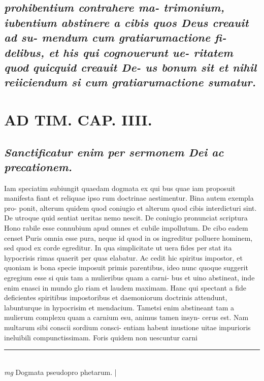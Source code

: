 \documentclass{article}
\begin{document}
\begin{pages}
\subsection*{\textit{prohibentium contrahere ma- trimonium, iubentium abstinere a cibis quos Deus creauit ad su- mendum cum gratiarumactione fi- delibus, et his qui cognouerunt ue- ritatem quod quicquid creauit De- us bonum sit et nihil reiiciendum si cum gratiarumactione sumatur. }}
\section*{AD TIM. CAP. IIII. }
\marginpar{[ p.138 ]}
{}
\subsection*{\textit{Sanctificatur enim per sermonem Dei ac precationem. }}\pstart Iam speciatim subiungit quaedam dogmata ex qui bus quae iam proposuit manifesta fiant et reliquae ipso rum doctrinae aestimentur. Bina autem exempla pro- ponit, alterum quidem quod coniugio et alterum quod cibis interdicturi sint. De utroque quid sentiat ueritas nemo nescit. De coniugio pronunciat scriptura Hono rabile esse connubium apud omnes et cubile impollutum. De cibo eadem censet Puris omnia esse pura, neque id quod in os ingreditur polluere hominem, sed quod ex corde egreditur. In qua simplicitate ut uera fides per stat ita hypocrisis rimas quaerit per quas elabatur. Ac cedit hic spiritus impostor, et quoniam is bona specie imposuit primis parentibus, ideo nunc quoque suggerit egregium esse si quis tam a mulieribus quam a carni- bus et uino abstineat, inde enim enasci in mundo glo riam et laudem maximam. Hanc qui spectant a fide deficientes spiritibus impostoribus et daemoniorum doctrinis attendunt, labunturque in hypocrisim et mendacium. Tametsi enim abstineant tam a mulierum complexu quam a carnium esu, animus tamen insyn- cerus est. Nam multarum sibi conscii sordium consci- entiam habent inustione uitae impurioris ineluibili compunctissimam. Foris quidem non uescuntur carni  \pend
\vspace{0.5cm}\noindent
\vspace{0.2cm}\rule{1cm}{0.2pt}\\ 
\hspace{0.2cm}\textit{mg}
\footnotesize Dogmata pseudopro phetarum. 
\normalsize| 

\end{pages}
\end{document}
